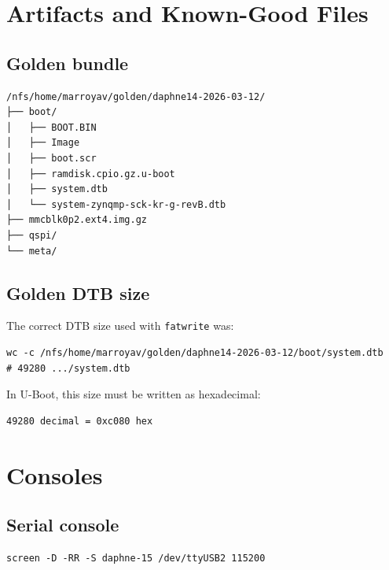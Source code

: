 \documentclass[a4paper,11pt]{article}
\begin{document}
\clearpage
\section{Artifacts and Known-Good Files}

\subsection*{Golden bundle}
\begin{listing}[H]
\begin{verbatim}
/nfs/home/marroyav/golden/daphne14-2026-03-12/
├── boot/
│   ├── BOOT.BIN
│   ├── Image
│   ├── boot.scr
│   ├── ramdisk.cpio.gz.u-boot
│   ├── system.dtb
│   └── system-zynqmp-sck-kr-g-revB.dtb
├── mmcblk0p2.ext4.img.gz
├── qspi/
└── meta/
\end{verbatim}
\caption{Golden recovery bundle}
\end{listing}

\subsection*{Golden DTB size}
The correct DTB size used with \texttt{fatwrite} was:
\begin{listing}[H]
\begin{verbatim}
wc -c /nfs/home/marroyav/golden/daphne14-2026-03-12/boot/system.dtb
# 49280 .../system.dtb
\end{verbatim}
\caption{Golden DTB size}
\end{listing}

In U-Boot, this size must be written as hexadecimal:
\begin{listing}[H]
\begin{verbatim}
49280 decimal = 0xc080 hex
\end{verbatim}
\caption{DTB size for U-Boot fatwrite}
\end{listing}

\clearpage
\section{Consoles}

\subsection*{Serial console}
\begin{listing}[H]
\begin{verbatim}
screen -D -RR -S daphne-15 /dev/ttyUSB2 115200
\end{verbatim}
\caption{Serial console to daphne-15}
\end{listing}
\end{document}
